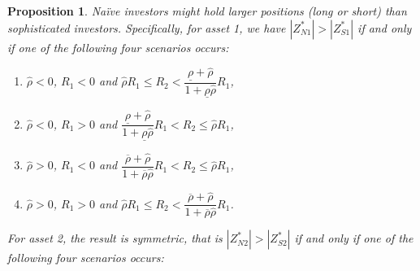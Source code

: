 \documentclass[10pt]{article}
\newtheorem{prop}{Proposition}
\begin{document}
\begin{prop}
Na\"ive investors might hold larger positions (long or short) than sophisticated investors. Specifically, for asset 1, we have $ |Z_{N1}^*| > |Z_{S1}^*|$ if and only if one of the following four scenarios occurs: 
\begin{enumerate}
\item [(1).] $ \hat{\rho} < 0 $, $ R_1 < 0 $ and $ \hat{\rho} R_1 \leqslant R_2 < \dfrac{\underline{\rho} + {\hat \rho}}{1 + \underline{\rho} {\hat \rho}} R_1 $,
\item [(2).] $ \hat{\rho} < 0 $, $ R_1 > 0 $ and $ \dfrac{\underline{\rho} + {\hat \rho}}{1 + \underline{\rho} {\hat \rho}} R_1 < R_2 \leqslant \hat{\rho} R_1 $, 
\item [(3).] $ \hat{\rho} > 0 $, $ R_1 < 0 $ and $ \dfrac{\overline{\rho} + {\hat \rho}}{1 + \overline{\rho} {\hat \rho}} R_1 < R_2 \leqslant \hat{\rho} R_1 $,
\item [(4).] $ \hat{\rho} > 0 $, $ R_1 > 0 $ and $ \hat{\rho} R_1 \leqslant R_2 < \dfrac{\overline{\rho} + {\hat \rho}}{1 + \overline{\rho} {\hat \rho}} R_1 $.
\end{enumerate}
For asset 2, the result is symmetric, that is $|Z_{N2}^{*}| > |Z_{S2}^{*}|$ if and only if one of the following four scenarios occurs: 

\end{prop}
\end{document}
